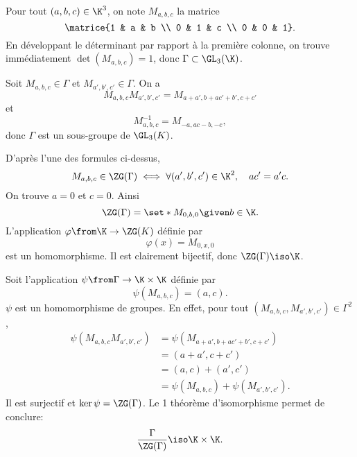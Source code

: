 Pour tout $(a,b,c)\in\K^3$, on note $M_{a,b,c}$ la matrice
\[
  \matrice{1 & a & b \\ 0 & 1 & c \\ 0 & 0 & 1}.
\]
En développant le déterminant par rapport à la première colonne, on trouve
immédiatement $\det(M_{a,b,c}) = 1$, donc $\Gamma\subset\GL_3(\K)$.

Soit $M_{a,b,c}\in\Gamma$ et $M_{a',b',c'}\in\Gamma$. On a
\[
  M_{a,b,c}M_{a',b',c'} = M_{a+a',b+ac'+b',c+c'}
\]
et
\[
  M_{a,b,c}^{-1} = M_{-a,ac-b,-c},
\]
donc $\Gamma$ est un sous-groupe de $\GL_3(K)$.

D'après l'une des formules ci-dessus,
\[
  M_{a,b,c}\in\ZG(\Gamma) \iff \forall (a',b',c')\in\K^2,\quad ac' = a'c.
\]
On trouve $a=0$ et $c=0$. Ainsi
\[
  \ZG(\Gamma)
  = \set*{M_{0,b,0} \given b \in \K}.
\]
L'application $\varphi\from\K\to\ZG(K)$ définie par
%
\[
  \varphi(x) = M_{0,x,0}
\]
%
est un homomorphisme. Il est clairement bijectif, donc $\ZG(\Gamma) \iso \K$.

Soit l'application $\psi\from\Gamma\to\K\times\K$ définie par
%
\[
  \psi(M_{a,b,c}) = (a,c).
\]
%
$\psi$ est un homomorphisme de groupes. En effet, pour tout
$(M_{a,b,c},M_{a',b',c'})\in\Gamma^2$,
%
\begin{align*}
  \psi(M_{a,b,c}M_{a',b',c'})
  &= \psi(M_{a+a',b+ac'+b',c+c'}) \\
  &= (a+a',c+c') \\
  &= (a,c)+(a',c') \\
  &= \psi(M_{a,b,c})+\psi(M_{a',b',c'}).
\end{align*}
%
Il est surjectif et
$\ker\psi = \ZG(\Gamma)$. Le 1 théorème d'isomorphisme permet
de conclure:
\[
  \frac{\Gamma}{\ZG(\Gamma)}\iso \K\times\K.
\]

